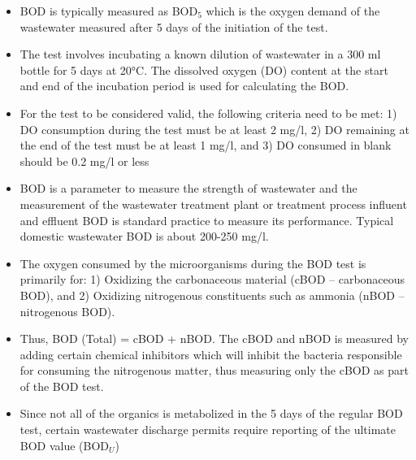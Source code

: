 \begin{itemize}
\begin{itemize}
			      		\item BOD is typically measured as BOD$_5$ which is the oxygen demand of the wastewater measured after 5 days of the initiation of the test.
			      		\item The test involves incubating a known dilution of wastewater in a 300 ml bottle for 5 days at 20\si{\degree}C.  The dissolved oxygen (DO) content at the start and end of the incubation period is used for calculating the BOD.
			      		\item For the test to be considered valid, the following criteria need to be met: 1) DO consumption during the test must be at least 2 mg/l, 2) DO remaining at the end of the test must be at least 1 mg/l, and 3) DO consumed in blank should be 0.2 mg/l or less
			      		      			
			      		\item BOD is a parameter to measure the strength of wastewater and the measurement of the wastewater treatment plant or treatment process influent and effluent BOD is standard practice to measure its performance.  Typical domestic wastewater BOD is about 200-250 mg/l.
			      		\item The oxygen consumed by the microorganisms during the BOD test is primarily for: 1) Oxidizing the carbonaceous material (cBOD – carbonaceous BOD), and 2) Oxidizing nitrogenous constituents such as ammonia (nBOD – nitrogenous BOD).
			      		\item Thus, BOD (Total) = cBOD + nBOD.  The cBOD and nBOD is measured by adding certain chemical inhibitors which will inhibit the bacteria responsible for consuming the nitrogenous matter, thus measuring only the cBOD as part of the BOD test.
			      		\item Since not all of the organics is metabolized in the 5 days of the regular BOD test, certain wastewater discharge permits require reporting of the ultimate BOD value (BOD$_U$)\\
			      	\end{itemize}


\end{itemize}

